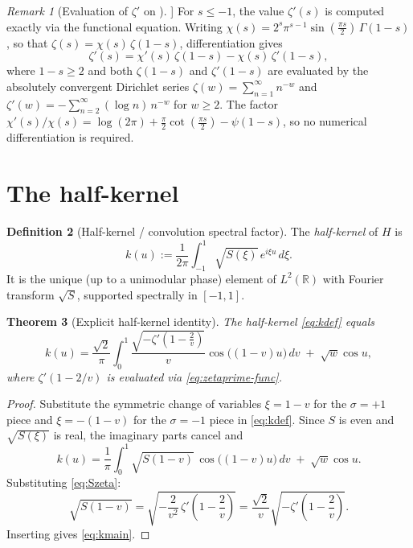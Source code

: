 \documentclass[11pt,reqno]{amsart}
\newtheorem{theorem}{Theorem}[section]
\theoremstyle{definition}
\newtheorem{definition}[theorem]{Definition}
\theoremstyle{remark}
\newtheorem{remark}[theorem]{Remark}
\begin{document}
\begin{remark}[Evaluation of \(\zeta'\) on \((-\infty,-1]\)]
For \(s \le -1\), the value \(\zeta'(s)\) is computed exactly via the
functional equation. Writing
\(\chi(s) = 2^s\pi^{s-1}\sin(\tfrac{\pi s}{2})\,\Gamma(1-s)\), so
that \(\zeta(s) = \chi(s)\,\zeta(1-s)\), differentiation gives
\begin{equation}\label{eq:zetaprime-func}
  \zeta'(s) = \chi'(s)\,\zeta(1-s) - \chi(s)\,\zeta'(1-s),
\end{equation}
where \(1-s \ge 2\) and both \(\zeta(1-s)\) and \(\zeta'(1-s)\) are
evaluated by the absolutely convergent Dirichlet series
\(\zeta(w) = \sum_{n=1}^\infty n^{-w}\) and
\(\zeta'(w) = -\sum_{n=2}^\infty (\log n)\,n^{-w}\) for \(w \ge 2\).
The factor \(\chi'(s)/\chi(s) = \log(2\pi) + \tfrac{\pi}{2}\cot(\tfrac{\pi
s}{2}) - \psi(1-s)\), so no numerical differentiation is required.
\end{remark}

\section{The half-kernel}

\begin{definition}[Half-kernel / convolution spectral factor]\label{def:k}
The \emph{half-kernel} of \(H\) is
\begin{equation}\label{eq:kdef}
  k(u) := \frac{1}{2\pi}\int_{-1}^{1}\sqrt{S(\xi)}\,e^{i\xi u}\,d\xi.
\end{equation}
It is the unique (up to a unimodular phase) element of
\(L^2(\mathbb{R})\) with Fourier transform \(\sqrt{S}\), supported
spectrally in \([-1,1]\).
\end{definition}

\begin{theorem}[Explicit half-kernel identity]\label{thm:halfkernel}
The half-kernel \eqref{eq:kdef} equals
\begin{equation}\label{eq:kmain}
  k(u)
  = \frac{\sqrt{2}}{\pi}
    \int_0^1
    \frac{\sqrt{-\zeta'\!\left(1-\tfrac{2}{v}\right)}}{v}
    \cos\!\bigl((1-v)u\bigr)\,dv
    \;+\; \sqrt{w}\cos u,
\end{equation}
where \(\zeta'(1-2/v)\) is evaluated via \eqref{eq:zetaprime-func}.
\end{theorem}

\begin{proof}
Substitute the symmetric change of variables \(\xi = 1-v\) for the
\(\sigma=+1\) piece and \(\xi = -(1-v)\) for the \(\sigma=-1\) piece
in \eqref{eq:kdef}. Since \(S\) is even and \(\sqrt{S(\xi)}\) is real,
the imaginary parts cancel and
\[
  k(u)
  = \frac{1}{\pi}\int_0^1\sqrt{S(1-v)}\,\cos\!\bigl((1-v)u\bigr)\,dv
    \;+\; \sqrt{w}\cos u.
\]
Substituting \eqref{eq:Szeta}:
\[
  \sqrt{S(1-v)}
  = \sqrt{-\frac{2}{v^2}\,\zeta'\!\!\left(1-\frac{2}{v}\right)}
  = \frac{\sqrt{2}}{v}\sqrt{-\zeta'\!\!\left(1-\frac{2}{v}\right)}.
\]
Inserting gives \eqref{eq:kmain}.
\end{proof}
\end{document}
